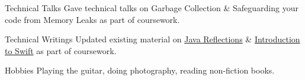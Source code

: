 


\begin{cvskills}


  \cvskill
  {Technical Talks}
  {Gave technical talks on Garbage Collection \& Safeguarding your code from Memory Leaks as part of coursework.}

  
  \cvskill
  {Technical Writings}
  {Updated existing material on \href{https://github.com/se-edu/learningresources/pull/30}{Java Reflections} \& \href{https://github.com/se-edu/learningresources/pull/31}{Introduction to Swift} as part of coursework.}


  \cvskill
  {Hobbies}
  {Playing the guitar, doing photography, reading non-fiction books.}


\end{cvskills}